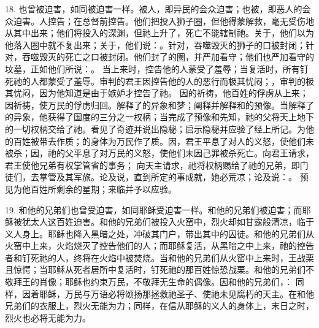 18. 也曾被迫害，如同被迫害一样。被人，即异民的会众迫害；也被，即恶人的会众迫害。人控告；在总督前控告。他们把投入狮子圈，但他得蒙解救，毫无受伤地从其中出来；他们将投入的深渊，但祂上升了，死亡不能辖制祂。关于，他们以为他落入圈中就不复出来；关于，他们说：。针对，吞噬毁灭的狮子的口被封闭；针对，吞噬毁灭的死亡之口被封闭。他们封了的圈，并严加看守；他们也严加看守的坟墓，正如他们所说：。 当上来时，控告他的人蒙受了羞辱；当复活时，所有钉死祂的人都蒙受了羞辱。审判的君王因控告他的人的恶行而极其忧闷；，审判的极其忧闷，因为他知道是由于嫉妒才控告了祂。 因的祈祷，他百姓的俘虏从上来；因祈祷，使万民的俘虏归回。解释了的异象和梦；阐释并解释和的预像。当解释了的异象，他获得了国度的三分之一权柄；当完成了预像和先知，祂的父将天上地下的一切权柄交给了祂。看见了奇迹并说出隐秘；启示隐秘并应验了经上所记。为他的百姓被带去作质；的身体为万民作了质。因，君王平息了对人的义怒，使他们未被杀；因，祂的父平息了对万民的义怒，使他们未因己罪被杀死亡。向君王请求，君王使他兄弟有权掌管省的事务； 向天主请求，祂将权柄赐给了祂的兄弟，即门徒们，去掌管及其军旅。论及说，直到所定的事成就，她必荒凉；论及说：。 预见为他百姓所剩余的星期；来临并予以应验。\par

19. 和他的兄弟们也曾受迫害，如同耶稣受迫害一样。和他的兄弟们被迫害；而耶稣被犹太人这百姓迫害。和他的兄弟们被投入火窑中，烈火却如甘露般清凉，临于义人身上。耶稣也降入黑暗之处，冲破其门户，带出其中的囚徒。和他的兄弟们从火窑中上来，火焰烧灭了控告他们的人；而耶稣复活，从黑暗之中上来，祂的控告者和钉死祂的人，终将在火焰中被焚烧。当和他的兄弟们从火窑中上来时，王战栗且惊愕；当耶稣从死者居所中复活时，钉死祂的那百姓惊恐战栗。和他的兄弟们不敬拜王的肖像；耶稣也约束万民，不敬拜无生命的偶像。因和他的兄弟们，： 同样，因着耶稣，万民与万语必将颂扬那拯救祂圣子、使祂未见腐朽的天主。在和他兄弟们的衣服上，烈火无能为力；同样，在信从耶稣的义人的身体上，末日之时，烈火也必将无能为力。\par


